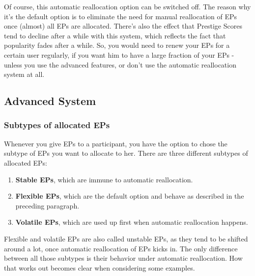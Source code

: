 \documentclass[a4paper,12pt]{scrartcl}
\newcounter{example}
\begin{document}
Of course, this automatic reallocation option can be switched off. The reason why it's the default option is to eliminate the need for manual reallocation of EPs once (almost) all EPs are allocated. There's also the effect that Prestige Scores tend to decline after a while with this system, which reflects the fact that popularity fades after a while. So, you would need to renew your EPs for a certain user regularly, if you want him to have a large fraction of your EPs - unless you use the advanced features, or don't use the automatic reallocation system at all. 

\subsection{Advanced System}
\subsubsection{Subtypes of allocated EPs}
Whenever you give EPs to a participant, you have the option to chose the subtype of EPs you want to allocate to her. There are three different subtypes of allocated EPs:
\begin{enumerate}
 \item \textbf{Stable EPs}, which are immune to automatic reallocation.
 \item \textbf{Flexible EPs}, which are the default option and behave as described in the preceding paragraph.
 \item \textbf{Volatile EPs}, which are used up first when automatic reallocation happens.
\end{enumerate}
Flexible and volatile EPs are also called unstable EPs, as they tend to be shifted around a lot, once automatic reallocation of EPs kicks in.
The only difference between all those subtypes is their behavior under automatic reallocation. How that works out becomes clear when considering some examples.
\end{document}
